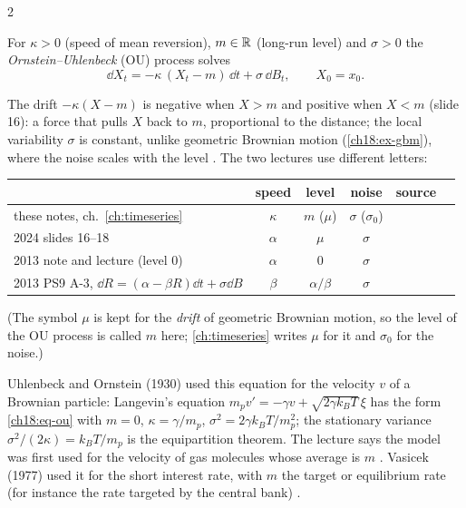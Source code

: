 \begin{paracol}{2}
\begin{definition}\label{ch18:def-ou}
For $\kappa>0$ (speed of mean reversion), $m\in\mathbb{R}$ (long-run level) and $\sigma>0$ the \emph{Ornstein--Uhlenbeck} (OU) process solves
\begin{equation}\label{ch18:eq-ou}
  \dd X_t=-\kappa\,(X_t-m)\,\dd t+\sigma\,\dd B_t,\qquad X_0=x_0 .
\end{equation}
\end{definition}
The drift $-\kappa(X-m)$ is negative when $X>m$ and positive when $X<m$ (slide 16): a force that pulls $X$ back to $m$, proportional to the distance; the local variability $\sigma$ is constant, unlike geometric Brownian motion (\cref{ch18:ex-gbm}), where the noise scales with the level . The two lectures use different letters:
\begin{center}
\small
\begin{tabular}{@{}l c c c c c@{}}
\toprule
 & speed & level & noise & source\\
\midrule
these notes, ch.~\ref{ch:timeseries} & $\kappa$ & $m$ ($\mu$) & $\sigma$ ($\sigma_0$) & \\
2024 slides 16--18 & $\alpha$ & $\mu$ & $\sigma$ & \\
2013 note and lecture (level $0$) & $\alpha$ & $0$ & $\sigma$ & \\
2013 PS9 A-3, $\dd R=(\alpha-\beta R)\dd t+\sigma\dd B$ & $\beta$ & $\alpha/\beta$ & $\sigma$ & \\
\bottomrule
\end{tabular}
\end{center}
(The symbol $\mu$ is kept for the \emph{drift} of geometric Brownian motion, so the level of the OU process is called $m$ here; \cref{ch:timeseries} writes $\mu$ for it and $\sigma_0$ for the noise.)

\begin{history}
Uhlenbeck and Ornstein (1930) used this equation for the velocity $v$ of a Brownian particle: Langevin's equation $m_pv'=-\gamma v+\sqrt{2\gamma k_BT}\,\xi$ has the form \eqref{ch18:eq-ou} with $m=0$, $\kappa=\gamma/m_p$, $\sigma^2=2\gamma k_BT/m_p^2$; the stationary variance $\sigma^2/(2\kappa)=k_BT/m_p$ is the equipartition theorem. The lecture says the model was first used for the velocity of gas molecules whose average is $m$ . Vasicek (1977) used it for the short interest rate, with $m$ the target or equilibrium rate (for instance the rate targeted by the central bank) .


\end{history}
\end{paracol}
